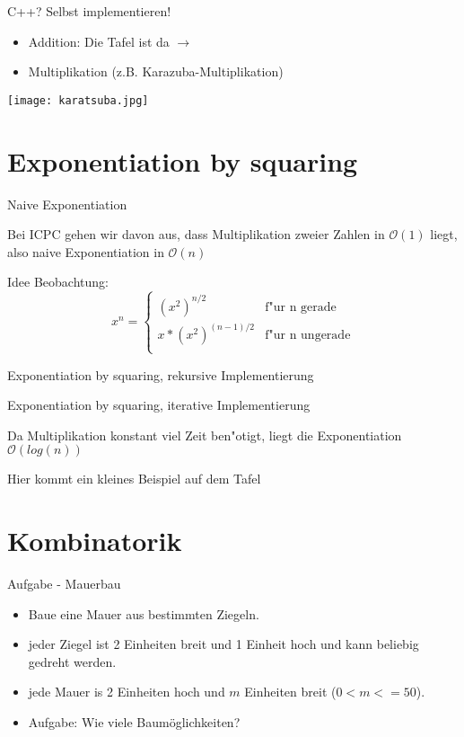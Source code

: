 \documentclass[18pt]{beamer}
\begin{document}
\begin{frame} {C++? Selbst implementieren!}
\begin {itemize}
\item Addition: Die Tafel ist da $\longrightarrow{}$
\item Multiplikation (z.B. Karazuba-Multiplikation)
\end {itemize}
\texttt{[image: karatsuba.jpg]}
\end{frame}

\section {Exponentiation by squaring}
\begin{frame} {Naive Exponentiation} 

Bei ICPC gehen wir davon aus, dass Multiplikation zweier Zahlen in $\mathcal{O}(1)$ liegt, also naive Exponentiation in $\mathcal{O}(n)$
\end{frame}

\begin{frame} {Idee}
Beobachtung:
\begin{equation}
   x^{n} =
   \begin{cases}
     (x^{2})^{n/2} & \text{f"ur n gerade} \\
      x*(x^{2})^{(n-1)/2} & \text{f"ur n ungerade} \\
   \end{cases}
\end{equation}
\end{frame}

\begin{frame} {Exponentiation by squaring, rekursive Implementierung}

\end{frame}

\begin{frame} {Exponentiation by squaring, iterative Implementierung}

Da Multiplikation konstant viel Zeit ben"otigt, liegt die Exponentiation$\mathcal{O}(log(n))$
\end{frame}


\begin{frame}{Hier kommt ein kleines Beispiel auf dem Tafel}
\end{frame}

\section{Kombinatorik}
\begin{frame}{Aufgabe - Mauerbau}
\begin{itemize}
	\item Baue eine Mauer aus bestimmten Ziegeln.
	\item jeder Ziegel ist 2 Einheiten breit und 1 Einheit hoch und kann beliebig gedreht werden.
	\item jede Mauer is 2 Einheiten hoch und \(m\) Einheiten breit (\(0<m<=50\)). 
	\item Aufgabe: Wie viele Baumöglichkeiten?
\end{itemize}
\end{frame}
\end{document}
